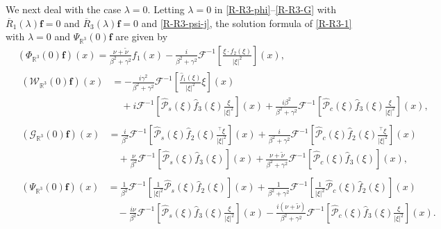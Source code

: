 \documentclass[dvipdfmx,12pt]{article}
\begin{document}
\vskip1mm
We next deal with the case $\lambda=0$. Letting $\lambda=0$ in \eqref{R-R3-phi}--\eqref{R-R3-G} with $\overline{R}_1(\lambda)\mathbf{f}=0$ and $\overline{R}_3(\lambda)\mathbf{f}=0$ and \eqref{R-R3-psi-j}, the solution formula of \eqref{R-R3-1} with $\lambda=0$ and $\Psi_{\mathbb{R}^3}(0)\mathbf{f}$  are given by
\begin{align}
&\label{R-R3-0-phi}
(\Phi_{\mathbb{R}^3}(0)\mathbf{f})(x)=\frac{\nu+\tilde{\nu} }{\beta^2+\gamma^2}f_1(x) 
-\frac{i}{\beta^2+\gamma^2}\mathcal{F}^{-1}\left[\frac{\xi\cdot\widehat{f}_2(\xi)}{|\xi|^2}\right](x),
\\
&\label{R-R3-0-w}
\begin{aligned}
(\mathcal{W}_{\mathbb{R}^3}(0)\mathbf{f})(x) &=-\frac{i\gamma^2}{\beta^2+\gamma^2}\mathcal{F}^{-1}\left[\frac{\widehat{f}_1(\xi)}{|\xi|^2}\xi\right](x) \\
&\quad 
+i\mathcal{F}^{-1}\left[\widehat{\mathcal{P}}_s(\xi)\widehat{f}_3(\xi)\frac{\xi}{|\xi|^2}\right](x)+\frac{i\beta^2}{\beta^2+\gamma^2}\mathcal{F}^{-1}\left[\widehat{\mathcal{P}}_c(\xi)\widehat{f}_3(\xi)\frac{\xi}{|\xi|^2}\right](x),
\end{aligned}
\\
&\label{R-R3-0-G}
\begin{aligned}
(\mathcal{G}_{\mathbb{R}^3}(0)\mathbf{f})(x) 
&=\frac{i}{\beta^2}\mathcal{F}^{-1}\left[\widehat{\mathcal{P}}_s(\xi)\widehat{f}_2(\xi)\frac{{}^\top \xi}{|\xi|^2}\right](x)+\frac{i}{\beta^2+\gamma^2}\mathcal{F}^{-1}\left[\widehat{\mathcal{P}}_c(\xi)\widehat{f}_2(\xi)\frac{{}^\top \xi}{|\xi|^2}\right](x)\\
&\quad
 +\frac{\nu}{\beta^2}\mathcal{F}^{-1}[\widehat{\mathcal{P}}_s(\xi)\widehat{f}_3(\xi)](x)+\frac{\nu+\tilde{\nu}}{\beta^2+\gamma^2}\mathcal{F}^{-1}[\widehat{\mathcal{P}}_c(\xi)\widehat{f}_3(\xi)](x),
\end{aligned}
\\
&\label{R-R3-0-psi}
\begin{aligned}
(\Psi_{\mathbb{R}^3}(0)\mathbf{f})(x) 
&=\frac{1}{\beta^2}\mathcal{F}^{-1}\left[\frac{1}{|\xi|^2}\widehat{\mathcal{P}}_s(\xi)\widehat{f}_2(\xi)\right](x)+\frac{1}{\beta^2+\gamma^2}\mathcal{F}^{-1}\left[\frac{1}{|\xi|^2}\widehat{\mathcal{P}}_c(\xi)\widehat{f}_2(\xi)\right](x)\\[1ex]
&\quad 
-\frac{i\nu}{\beta^2}\mathcal{F}^{-1}\left[\widehat{\mathcal{P}}_s(\xi)\widehat{f}_3(\xi)\frac{\xi}{|\xi|^2}\right](x)-\frac{i(\nu+\tilde{\nu})}{\beta^2+\gamma^2}\mathcal{F}^{-1}\left[\widehat{\mathcal{P}}_c(\xi)\widehat{f}_3(\xi)\frac{\xi}{|\xi|^2}\right](x).
\end{aligned}
\end{align}
\end{document}
